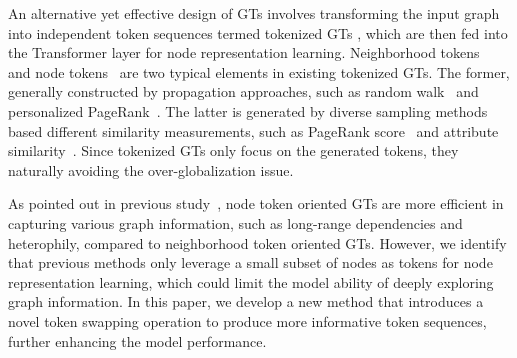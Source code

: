 An alternative yet effective design of GTs involves transforming the input graph into independent token sequences termed tokenized GTs \cite{ansgt,nagphormer,vcrgt,polyformer,ntformer}, which are then fed into the Transformer layer for node representation learning. 
Neighborhood tokens~\cite{nagphormer,nag+,polyformer,vcrgt,ntformer} and node tokens~\cite{ansgt,ntformer,vcrgt} are two typical elements in existing tokenized GTs.
The former, generally constructed by propagation approaches, such as random walk~\cite{nagphormer,nag+} and personalized PageRank~\cite{vcrgt}.
The latter is generated by diverse sampling methods based different similarity measurements, such as PageRank score~\cite{vcrgt} and attribute similarity~\cite{ansgt}. 
Since tokenized GTs only focus on the generated tokens, they naturally avoiding the over-globalization issue.

As pointed out in previous study~\cite{vcrgt}, node token oriented GTs are more efficient in capturing various graph information, such as long-range dependencies and heterophily, compared to neighborhood token oriented GTs.
However, we identify that previous methods only leverage a small subset of nodes as tokens for node representation learning, which could limit the model ability of deeply exploring graph information.
In this paper, we develop a new method \name that introduces a novel token swapping operation to produce more informative token sequences, further enhancing the model performance.